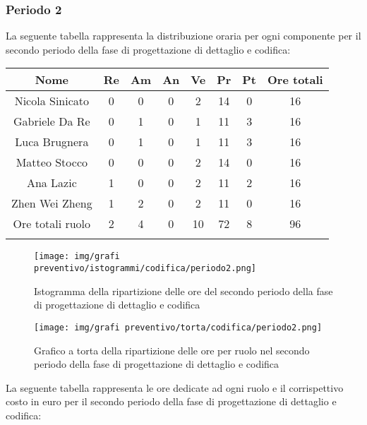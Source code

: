 %
\newpage
\subsubsection{Periodo 2}
%
La seguente tabella rappresenta la distribuzione oraria per ogni componente per il secondo periodo della fase di progettazione di dettaglio e codifica:

	\setlength\extrarowheight{5pt}
	\begin{tabularx}{\textwidth}{|ccccccc|c|}
		\hline
		\rowcolor{white}
		\textbf{Nome} & \textbf{Re} & \textbf{Am} & \textbf{An} & \textbf{Ve} & \textbf{Pr}& \textbf{Pt} & \textbf{Ore totali} \\
		\hline
		Nicola Sinicato &0&0&0&2&14&0&16 \\
		Gabriele Da Re &0&1&0&1&11&3&16 \\
		Luca Brugnera &0&1&0&1&11&3&16 \\
		Matteo Stocco &0&0&0&2&14&0&16 \\
		Ana Lazic &1&0&0&2&11&2&16 \\
		Zhen Wei Zheng &1&2&0&2&11&0&16 \\
		\hline
		Ore totali ruolo &2&4&0&10&72&8&96 \\
		\hline
		\rowcolor{white}
		\caption{Distribuzione oraria durante  il secondo periodo di progettazione di dettaglio e codifica per ruolo e persona}
	\end{tabularx}
	\vspace{10pt}
	
\begin{figure}[H]
    \centering
    \texttt{[image: img/grafi preventivo/istogrammi/codifica/periodo2.png]}
    \caption{Istogramma della ripartizione delle ore del secondo periodo della fase di progettazione di dettaglio e codifica}
\end{figure}
\begin{figure}[H]
    \centering
    \texttt{[image: img/grafi preventivo/torta/codifica/periodo2.png]}
    \caption{Grafico a torta della ripartizione delle ore per ruolo nel secondo periodo della fase di progettazione di dettaglio e codifica}
\end{figure}
La seguente tabella rappresenta le ore dedicate ad ogni ruolo e il corrispettivo costo in euro per il secondo periodo della fase di progettazione di dettaglio e codifica:

